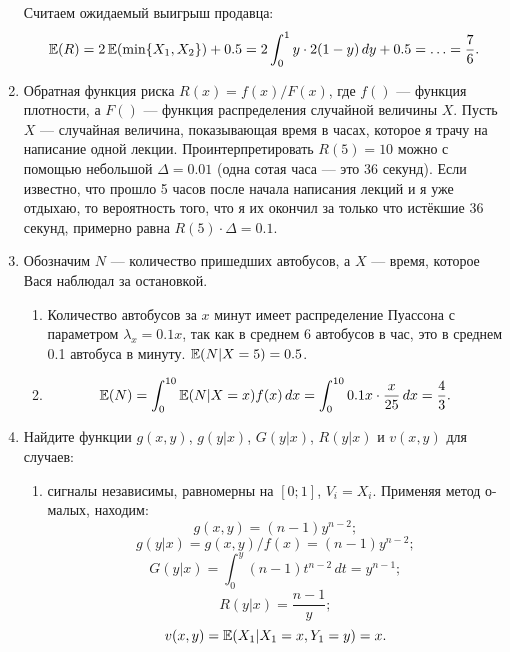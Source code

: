 \begin{enumerate}
Считаем ожидаемый выигрыш продавца:
\begin{equation}
\operatorname{\mathbb{E}}(R)=2\operatorname{\mathbb{E}}(\min\{X_{1},X_{2}\})+0.5=
2\int_{0}^{1}y\cdot 2(1-y) \, dy+0.5=
\ldots=\frac{7}{6}.
\end{equation}


\item Обратная функция риска  $ R(x)=f(x)/F(x) $, где $ f() $ — функция плотности, а $ F() $ — функция распределения случайной величины $ X $. Пусть $ X $ — случайная величина, показывающая время в часах, которое я трачу на написание одной лекции. Проинтерпретировать $ R(5)=10 $ можно с помощью небольшой $ \Delta=0.01 $ (одна сотая часа — это 36 секунд). Если известно, что прошло 5 часов после начала написания лекций и я уже отдыхаю, то вероятность того, что я их окончил за только что истёкшие 36 секунд, примерно равна $ R(5)\cdot \Delta=0.1 $.
\item Обозначим $ N$ — количество пришедших автобусов, а $ X $ — время, которое Вася наблюдал за остановкой.
\begin{enumerate}
\item Количество автобусов за $ x $ минут имеет распределение Пуассона с параметром $ \lambda_{x}=0.1x $, так как в среднем 6 автобусов в час, это в среднем 0.1 автобуса в минуту. $ \operatorname{\mathbb{E}}(N|X=5)=0.5 $.
\item
\begin{equation}
\operatorname{\mathbb{E}}(N)=\int_{0}^{10}\operatorname{\mathbb{E}}(N|X=x)f(x) \, dx=
\int_{0}^{10}0.1x\cdot \frac{x}{25} \, dx=
\frac{4}{3}.
\end{equation}
\end{enumerate}
\item Найдите функции $ g(x,y)$, $ g(y|x)$, $ G(y|x)$,  $R(y|x)$ и $v(x,y)$ для случаев:
\begin{enumerate}
\item сигналы независимы, равномерны на $ [0;1] $, $ V_{i}=X_{i} $.
Применяя метод о-малых, находим:
\begin{equation}
g(x,y)=(n-1)y^{n-2};
\end{equation}
\begin{equation}
g(y|x)=g(x,y)/f(x)=(n-1)y^{n-2};
\end{equation}
\begin{equation}
G(y|x)=\int_{0}^{y}(n-1)t^{n-2} \, dt=y^{n-1};
\end{equation}
\begin{equation}
R(y|x)=\frac{n-1}{y};
\end{equation}
\begin{equation}
v(x,y)=\operatorname{\mathbb{E}}(X_{1}|X_{1}=x,Y_{1}=y)=x.
\end{equation}


\end{enumerate}
\end{enumerate}
